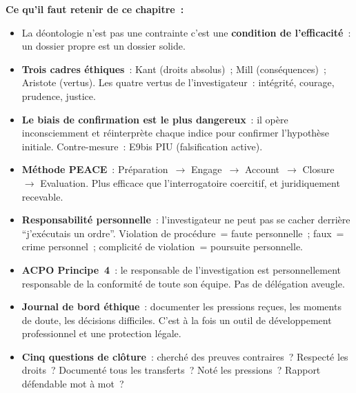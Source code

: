 \begin{boxresume}
\textbf{Ce qu'il faut retenir de ce chapitre~:}
\begin{itemize}
    \item La déontologie n'est pas une contrainte c'est une
          \textbf{condition de l'efficacité}~: un dossier propre est
          un dossier solide.

    \item \textbf{Trois cadres éthiques}~: Kant (droits absolus)~;
          Mill (conséquences)~; Aristote (vertus). Les quatre vertus
          de l'investigateur~: intégrité, courage, prudence, justice.

    \item \textbf{Le biais de confirmation est le plus dangereux}~:
          il opère inconsciemment et réinterprète chaque indice
          pour confirmer l'hypothèse initiale. Contre-mesure~:
          E9bis PIU (falsification active).

    \item \textbf{Méthode PEACE}~: Préparation~$\to$ Engage~$\to$
          Account~$\to$ Closure~$\to$ Evaluation. Plus efficace que
          l'interrogatoire coercitif, et juridiquement recevable.

    \item \textbf{Responsabilité personnelle}~: l'investigateur ne
          peut pas se cacher derrière ``j'exécutais un ordre''.
          Violation de procédure~= faute personnelle~; faux~= crime
          personnel~; complicité de violation~= poursuite personnelle.

    \item \textbf{ACPO Principe~4}~: le responsable de l'investigation
          est personnellement responsable de la conformité de toute
          son équipe. Pas de délégation aveugle.

    \item \textbf{Journal de bord éthique}~: documenter les pressions
          reçues, les moments de doute, les décisions difficiles.
          C'est à la fois un outil de développement professionnel
          et une protection légale.

    \item \textbf{Cinq questions de clôture}~: cherché des preuves
          contraires~? Respecté les droits~? Documenté tous les
          transferts~? Noté les pressions~? Rapport défendable
          mot à mot~?
\end{itemize}
\end{boxresume}

